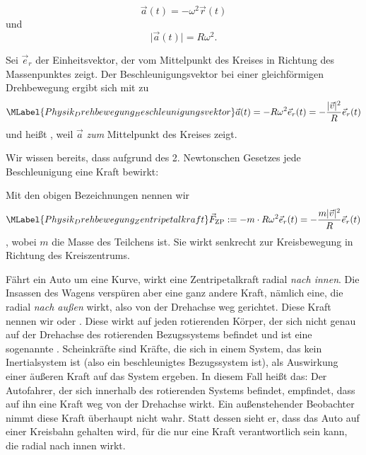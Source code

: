 \begin{MContent}
             \begin{equation*}\vec{a}(t)=-\omega^2\vec{r}(t) 
             \end{equation*} und
             \begin{equation*}\vert\vec{a}(t)\vert=R\omega^2. 
             \end{equation*}
             
             \begin{MInfo}
                Sei $\vec{e}_r$ der Einheitsvektor, der vom Mittelpunkt des Kreises in Richtung des Massenpunktes zeigt. Der Beschleunigungsvektor bei einer gleichf\"ormigen Drehbewegung ergibt sich mit  zu
               \begin{equation}\MLabel{Physik_Drehbewegung_Beschleunigungsvektor}
               \vec{a}(t)=-R\omega^2\vec{e}_r(t)=-\frac{\vert \vec{v}\vert^2}{R}\vec{e}_r(t)
               \end{equation} und hei{\ss}t , weil $\vec{a}$ \emph{zum} Mittelpunkt des Kreises zeigt. 
               \end{MInfo}
               
               Wir wissen bereits, dass aufgrund des 2. Newtonschen Gesetzes jede Beschleunigung eine Kraft bewirkt:
               \begin{MInfo}
                 Mit den obigen Bezeichnungen nennen wir 
                 \begin{equation}\MLabel{Physik_Drehbewegung_Zentripetalkraft}
                 \vec{F}_{\textrm{ZP}}:=-m\cdot R\omega^2\vec{e}_r(t)=-\frac{m\vert \vec{v}\vert^2}{R}\vec{e}_r(t)
                 \end{equation} , wobei $m $ die Masse des Teilchens ist. Sie wirkt senkrecht zur Kreisbewegung in Richtung des Kreiszentrums. 
                 \end{MInfo}
                 F\"ahrt ein Auto um eine Kurve, wirkt eine Zentripetalkraft radial \emph{nach innen}. Die Insassen des Wagens versp\"uren aber eine ganz andere Kraft, n\"amlich eine, die radial \emph{nach au{\ss}en} wirkt, also von der Drehachse weg gerichtet. Diese Kraft nennen wir  oder . Diese wirkt auf jeden rotierenden K\"orper, der sich nicht genau auf der Drehachse des rotierenden Bezugssystems befindet und ist eine sogenannte . Scheinkr\"afte sind Kr\"afte, die sich in einem System, das kein Inertialsystem ist (also ein beschleunigtes Bezugssystem ist), als Auswirkung einer \"au{\ss}eren Kraft auf das System ergeben. In diesem Fall hei{\ss}t das: Der Autofahrer, der sich innerhalb des rotierenden Systems befindet, empfindet, dass auf ihn eine Kraft weg von der Drehachse wirkt. Ein au{\ss}enstehender Beobachter nimmt diese Kraft \"uberhaupt nicht wahr. Statt dessen sieht er, dass das Auto auf einer Kreisbahn gehalten wird, f\"ur die nur eine Kraft verantwortlich sein kann, die radial nach innen wirkt.
                 
               \end{MContent}
             
